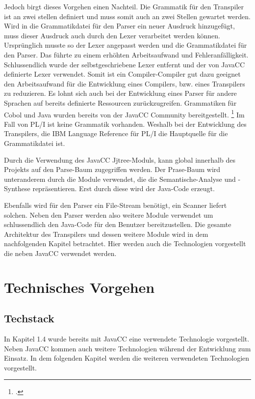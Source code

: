 Jedoch birgt dieses Vorgehen einen Nachteil. Die Grammatik für den Transpiler ist an zwei stellen definiert und muss somit auch an zwei Stellen gewartet werden.
Wird in die Grammatikdatei für den Parser ein neuer Ausdruck hinzugefügt, muss dieser Ausdruck auch durch den Lexer verarbeitet werden können.
Ursprünglich musste so der Lexer angepasst werden und die Grammatikdatei für den Parser. 
Das führte zu einem erhöhten Arbeitsaufwand und Fehleranfälligkeit. Schlussendlich wurde der selbstgeschriebene Lexer entfernt und der von JavaCC definierte Lexer verwendet.
Somit ist ein Compiler-Compiler gut dazu geeignet den Arbeitsaufwand für die Entwicklung eines Compilers, bzw. eines Transpilers zu reduzieren. 
Es lohnt sich auch bei der Entwicklung eines Parser für andere Sprachen auf bereits definierte Ressourcen zurückzugreifen. 
Grammatiken für Cobol und Java wurden bereits von der JavaCC Community bereitgestellt. \footcite[Vgl. ][]{javaccdoku}
Im Fall von PL/I ist keine Grammatik vorhanden. Weshalb bei der Entwicklung des Transpilers, die IBM Language Reference für PL/I die Hauptquelle für die Grammatikdatei ist.   

Durch die Verwendung des JavaCC Jjtree-Moduls, kann global innerhalb des Projekts auf den Parse-Baum zugegriffen werden. 
Der Prase-Baum wird unteranderem durch die Module verwendet, die die Semantische-Analyse und -Synthese repräsentieren.
Erst durch diese wird der Java-Code erzeugt.

Ebenfalls wird für den Parser ein File-Stream benötigt, ein Scanner liefert solchen.
Neben den Parser werden also weitere Module verwendet um schlussendlich den Java-Code für den Benutzer bereitzustellen.
Die gesamte Architektur des Transpilers und dessen weitere Module wird in dem nachfolgenden Kapitel betrachtet. 
Hier werden auch die Technologien vorgestellt die neben JavaCC verwendet werden. 

\section{Technisches Vorgehen}
\subsection{Techstack}
In Kapitel 1.4 wurde bereits mit JavaCC eine verwendete Technologie vorgestellt. Neben JavaCC kommen auch weitere Technologien während der Entwicklung zum Einsatz. In dem folgenden Kapitel werden die weiteren verwendeten Technologien vorgestellt.

